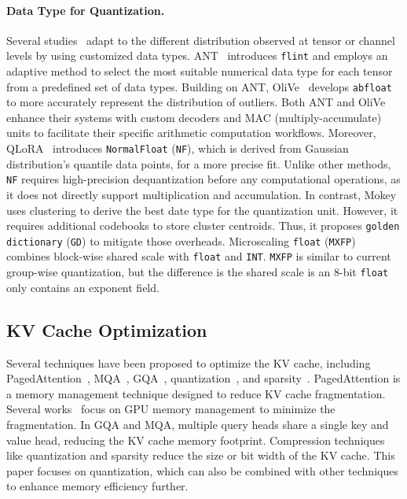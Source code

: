 \paragraph{Data Type for Quantization.}
Several studies~\cite{guo2022ant,dettmers2023qlora,zadeh2022mokey,ramachandran2024algorithmhardware} adapt to the different distribution observed at tensor or channel levels by using customized data types. ANT~\cite{guo2022ant} introduces \texttt{flint} and employs an adaptive method to select the most suitable numerical data type for each tensor from a predefined set of data types. Building on ANT, OliVe~\cite{guo2023olive} develops \texttt{abfloat} to more accurately represent the distribution of outliers. Both ANT and OliVe enhance their systems with custom decoders and MAC (multiply-accumulate) units to facilitate their specific arithmetic computation workflows. Moreover, QLoRA~\cite{dettmers2023qlora} introduces \texttt{NormalFloat} (\texttt{NF}), which is derived from Gaussian distribution's quantile data points, for a more precise fit. Unlike other methods, \texttt{NF} requires high-precision dequantization before any computational operations, as it does not directly support multiplication and accumulation. In contrast, Mokey~\cite{zadeh2022mokey} uses clustering to derive the best date type for the quantization unit.
However, it requires additional codebooks to store cluster centroids.
Thus, it proposes \texttt{golden dictionary} (\texttt{GD}) to mitigate those overheads.
Microscaling \texttt{float} (\texttt{MXFP})~\cite{2023mxfp,NEURIPS2020_747e32ab} combines block-wise shared scale with \texttt{float} and \texttt{INT}.
\texttt{MXFP} is similar to current group-wise quantization, but the difference is the shared scale is an 8-bit \texttt{float} only contains an exponent field.

\subsection{KV Cache Optimization}
Several techniques have been proposed to optimize the KV cache, including PagedAttention~\cite{kwon2023efficient}, MQA~\cite{kwon2023efficient}, GQA~\cite{ainslie2023gqa}, quantization~\cite{kang2024gear,liu2024kivi,hooper2024kvquant,zhao2023atom}, and sparsity~\cite{zhang_h_2o_2023,li_snapkv_2024,adnan_keyformer_2024,zhang_q-hitter_2024,sun_triforce_2024}.
PagedAttention is a memory management technique designed to reduce KV cache fragmentation.
Several works~\cite{kwon2023efficient,guo2024gmlake,xu2024vtensor} focus on GPU memory management to minimize the fragmentation.
In GQA and MQA, multiple query heads share a single key and value head, reducing the KV cache memory footprint.
Compression techniques like quantization and sparsity reduce the size or bit width of the KV cache.
This paper focuses on quantization, which can also be combined with other techniques to enhance memory efficiency further.
